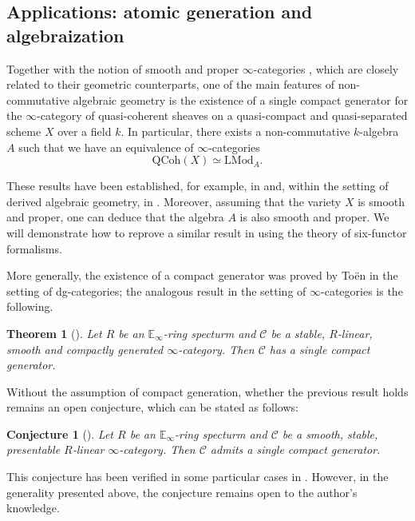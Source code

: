 \documentclass[oneside, hidelinks, 12pt, a4paper,reqno]{amsart}
\theoremstyle{plain}
\newtheorem{theorem}{Theorem}[section]
\newtheorem{conjecture}[conjecture]{Conjecture}
\theoremstyle{definition}
\theoremstyle{plain}
\newcommand{\cat}{$\infty$-category }
\newcommand{\cates}{$\infty$-categories }
\newcommand{\Qcoh}{\mathrm{QCoh}}
\newcommand{\LMod}{\mathrm{LMod}}
\begin{document}
\subsection{Applications: atomic generation and algebraization}
Together with the notion of smooth and proper \cates, which are closely related to their geometric counterparts, one of the main features of non-commutative algebraic geometry is the existence of a single compact generator for the \cat of quasi-coherent sheaves on a quasi-compact and quasi-separated scheme $X$ over a field $k$. In particular, there exists a non-commutative $k$-algebra $A$ such that we have an equivalence of \cates 
\[
\Qcoh(X) \simeq \LMod_{A}.
\]

These results have been established, for example, in \cite{bondal2002generatorsrepresentabilityfunctorscommutative} and, within the setting of derived algebraic geometry, in \cite{toen2011derivedazumayaalgebrasgenerators}. 
Moreover, assuming that the variety $X$ is smooth and proper, one can deduce that the algebra $A$ is also smooth and proper. We will demonstrate how to reprove a similar result in  using the theory of six-functor formalisms.   

More generally, the existence of a compact generator was proved by To\"en in the setting of dg-categories; the analogous result in the setting of \cates is the following.

\begin{theorem}[{\cite[Proposition 11.3.2.4]{SAG}}]\label{thm: compact generator for cpt generated cates}
    Let $R$ be an $\mathbb{E}_\infty$-ring specturm and $\mathscr{C}$ be a stable, $R$-linear, smooth and compactly generated $\infty$-category. Then $\mathscr{C}$ has a single compact generator. 
\end{theorem}

Without the assumption of compact generation, whether the previous result holds remains an open conjecture, which can be stated as follows: 

\begin{conjecture}[{\cite[Conjecture 0.6]{ramzi2024dualizablepresentableinftycategories}}]\label{conj: congettura Einfty}
    Let $R$ be an $\mathbb{E}_\infty$-ring specturm and $\mathscr{C}$ be a smooth, stable, presentable $R$-linear $\infty$-category. Then $\mathscr{C}$ admits a single compact generator.
\end{conjecture}

This conjecture has been verified in some particular cases in \cite{stefanich2023classification}. However, in the generality presented above, the conjecture remains open to the author's knowledge. 
\end{document}
